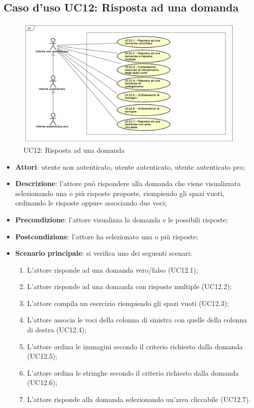 \newpage
\subsection{Caso d'uso UC12: Risposta ad una domanda}
\label{UC12}
\begin{figure}[h]
	\centering
	\includegraphics[scale=0.5]{UML/UC12.png}
	\caption{UC12: Risposta ad una domanda}
\end{figure}

\begin{itemize}
\item \textbf{Attori}: utente non autenticato, utente autenticato, utente autenticato pro;
\item \textbf{Descrizione}: l'attore può rispondere alla domanda che viene visualizzata selezionando una o più risposte proposte, riempiendo gli spazi vuoti, ordinando le risposte oppure associando due voci;
\item \textbf{Precondizione}: l'attore visualizza la domanda e le possibili risposte;
\item \textbf{Postcondizione}: l'attore ha selezionato una o più risposte;
\item \textbf{Scenario principale}: si verifica uno dei seguenti scenari:
\begin{enumerate}
	\item L'attore risponde ad una domanda vero/falso (UC12.1);
	\item L'attore risponde ad una domanda con risposte multiple (UC12.2);
	\item L'attore compila un esercizio riempiendo gli spazi vuoti (UC12.3);
	\item L'attore associa le voci della colonna di sinistra con quelle della colonna di destra (UC12.4);
	\item L'attore ordina le immagini secondo il criterio richiesto dalla domanda (UC12.5);
	\item L'attore ordina le stringhe secondo il criterio richiesto dalla domanda (UC12.6);
	\item L'attore risponde alla domanda selezionando un'area cliccabile (UC12.7). 
\end{enumerate}
\end{itemize}

